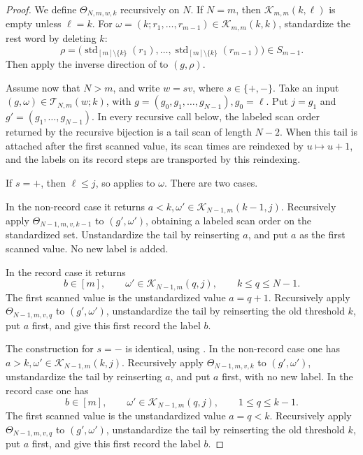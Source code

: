 \documentclass[10pt,a4paper]{amsart}
\begin{document}
\begin{proof}
We define \(\Theta_{N,m,w,k}\) recursively on \(N\).  If \(N=m\), then
\(\mathcal K_{m,m}(k,\ell)\) is empty unless \(\ell=k\).  For $\omega=(k;r_1,\ldots,r_{m-1})\in\mathcal K_{m,m}(k,k)$, standardize the rest word by deleting \(k\):
\[
\rho=
\bigl(\operatorname{std}_{[m]\setminus\{k\}}(r_1),
\ldots,
\operatorname{std}_{[m]\setminus\{k\}}(r_{m-1})\bigr)
\in S_{m-1}.
\]
Then apply the inverse direction of  to
\((g,\rho)\).

Assume now that \(N>m\), and write \(w=sv\), where \(s\in\{+,-\}\).  Take an
input \((g,\omega)\in\mathcal T_{N,m}(w;k)\), with $g=(g_0,g_1,\ldots,g_{N-1}), g_0=\ell$. Put \(j=g_1\) and \(g'=(g_1,\ldots,g_{N-1})\).  In every recursive call below,
the labeled scan order returned by the recursive bijection is a tail scan of
length \(N-2\).  When this tail is attached after the first scanned value, its
scan times are reindexed by \(u\mapsto u+1\), and the labels on its record
steps are transported by this reindexing.

If \(s=+\), then
\(\ell\le j\), so  applies to \(\omega\).
There are two cases.

In the non-record case it returns $a<k, \omega'\in\mathcal K_{N-1,m}(k-1,j)$. Recursively apply \(\Theta_{N-1,m,v,k-1}\) to \((g',\omega')\), obtaining a labeled scan order on the standardized set. Unstandardize the tail by
reinserting \(a\), and put \(a\) as the first scanned value.  No new label is
added.

In the record case it returns
\[
b\in[m],\qquad
\omega'\in\mathcal K_{N-1,m}(q,j),
\qquad k\le q\le N-1.
\]
The first scanned value is the unstandardized value \(a=q+1\).  Recursively
apply \(\Theta_{N-1,m,v,q}\) to \((g',\omega')\), unstandardize the tail by
reinserting the old threshold \(k\), put \(a\) first, and give this first
record the label \(b\).

The construction for \(s=-\) is identical, using
.  In the non-record case one has $a>k, \omega'\in\mathcal K_{N-1,m}(k,j)$. Recursively apply \(\Theta_{N-1,m,v,k}\) to \((g',\omega')\), unstandardize the
tail by reinserting \(a\), and put \(a\) first, with no new label.  In the
record case one has
\[
b\in[m],\qquad
\omega'\in\mathcal K_{N-1,m}(q,j),
\qquad 1\le q\le k-1.
\]
The first scanned value is the unstandardized value \(a=q<k\).  Recursively
apply \(\Theta_{N-1,m,v,q}\) to \((g',\omega')\), unstandardize the tail by
reinserting the old threshold \(k\), put \(a\) first, and give this first
record the label \(b\).


\end{proof}
\end{document}
